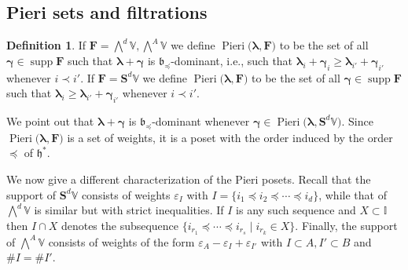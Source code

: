 \documentclass[11pt,fleqn]{amsart}
\newcommand\II{\mathbb I}
\renewcommand\epsilon{\varepsilon}
\theoremstyle{definition}
\newtheorem{defn}[thm]{Definition}
\theoremstyle{remark}
\theoremstyle{remark}
\newcommand\VV{\mathbb V}
\renewcommand\SS{\mathbf S}
\newcommand\lie[1]{\mathfrak{#1}}
\newcommand\wt[1]{\boldsymbol{#1}}
\DeclareMathOperator\supp{supp}
\newcommand\Pieri[2]{\operatorname{Pieri}{(#1},{#2)}}
\begin{document}
\subsection{Pieri sets and filtrations} 

\begin{defn}
If $\mathbf F = \bigwedge^d \VV, \bigwedge^A \VV$ we define 
$\Pieri{\wt\lambda}{\mathbf F}$ to be the set of all $\wt\gamma \in \supp 
\mathbf F$ such that $\wt\lambda + \wt\gamma$ is $\lie b_{\preceq}$-dominant, 
i.e., such that $\wt\lambda_i + \wt\gamma_i \geq \wt\lambda_{i'} + 
\wt\gamma_{i'}$ whenever $i \prec i'$.
If $\mathbf F = \SS^d\VV$ we define $\Pieri{\wt\lambda}{\mathbf F}$ to be the 
set of all $\wt\gamma \in \supp \mathbf F$ such that $\wt\lambda_i \geq \wt
\lambda_{i'} + \wt\gamma_{i'}$ whenever $i \prec i'$.
\end{defn}
We point out that $\wt\lambda + \wt\gamma$ is $\lie b_{\preceq}$-dominant whenever
$\wt\gamma \in \Pieri{\wt\lambda}{\SS^d\VV}$. Since 
$\Pieri{\wt\lambda}{\mathbf F}$ is a set of weights, it is a poset with the 
order induced by the order $\preceq$ of $\lie h^*$.

We now give a different characterization of the Pieri posets. Recall that
the support of $\SS^d\VV$ consists of weights $\epsilon_I$ with $I 
= \{i_1 \preceq i_2 \preceq \cdots \preceq i_d\}$, while that of $\bigwedge^d 
\VV$ is similar but with strict inequalities. If $I$ is any such sequence and
$X \subset \II$ then $I \cap X$ denotes the subsequence $\{i_{r_1} \preceq 
\cdots \preceq i_{r_s} \mid i_{r_k} \in X\}$. Finally, the support of 
$\bigwedge^A \VV$ consists of weights of the form $\epsilon_A - \epsilon_I + 
\epsilon_{I'}$ with $I \subset A, I' \subset B$ and $\#I = \#I'$. 
\end{document}
